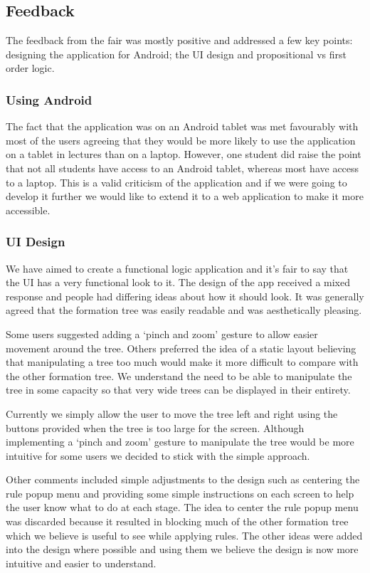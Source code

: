 \documentclass{report}
\begin{document}
\subsection{Feedback}

The feedback from the fair was mostly positive and addressed a few key points: designing the application for Android; the UI design and propositional vs first order logic.

\subsubsection{Using Android}

The fact that the application was on an Android tablet was met favourably with most of the users agreeing that they would be more likely to use the application on a tablet in lectures than on a laptop. However, one student did raise the point that not all students have access to an Android tablet, whereas most have access to a laptop. This is a valid criticism of the application and if we were going to develop it further we would like to extend it to a web application to make it more accessible.

\subsubsection{UI Design}

We have aimed to create a functional logic application and it's fair to say that the UI has a very functional look to it. The design of the app received a mixed response and people had differing ideas about how it should look. It was generally agreed that the formation tree was easily readable and was aesthetically pleasing. 

Some users suggested adding a `pinch and zoom' gesture to allow easier movement around the tree. Others preferred the idea of a static layout believing that manipulating a tree too much would make it more difficult to compare with the other formation tree. We understand the need to be able to manipulate the tree in some capacity so that very wide trees can be displayed in their entirety. 

Currently we simply allow the user to move the tree left and right using the buttons provided when the tree is too large for the screen. Although implementing a `pinch and zoom' gesture to manipulate the tree would be more intuitive for some users we decided to stick with the simple approach.

Other comments included simple adjustments to the design such as centering the rule popup menu and providing some simple instructions on each screen to help the user know what to do at each stage. The idea to center the rule popup menu was discarded because it resulted in blocking much of the other formation tree which we believe is useful to see while applying rules. The other ideas were added into the design where possible and using them we believe the design is now more intuitive and easier to understand.
\end{document}
